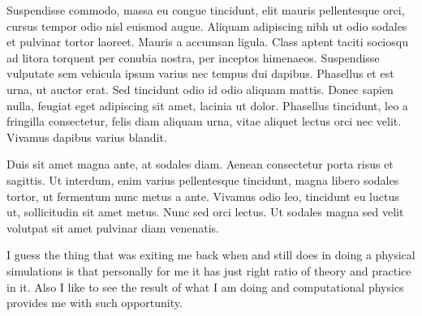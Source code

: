 \documentclass[11pt, a4paper]{awesome-cv}
\begin{document}
\begin{cvletter}
Suspendisse commodo, massa eu congue tincidunt, elit mauris pellentesque orci, cursus tempor odio nisl euismod augue. Aliquam adipiscing nibh ut odio sodales et pulvinar tortor laoreet. Mauris a accumsan ligula. Class aptent taciti sociosqu ad litora torquent per conubia nostra, per inceptos himenaeos. Suspendisse vulputate sem vehicula ipsum varius nec tempus dui dapibus. Phasellus et est urna, ut auctor erat. Sed tincidunt odio id odio aliquam mattis. Donec sapien nulla, feugiat eget adipiscing sit amet, lacinia ut dolor. Phasellus tincidunt, leo a fringilla consectetur, felis diam aliquam urna, vitae aliquet lectus orci nec velit. Vivamus dapibus varius blandit.

Duis sit amet magna ante, at sodales diam. Aenean consectetur porta risus et sagittis. Ut interdum, enim varius pellentesque tincidunt, magna libero sodales tortor, ut fermentum nunc metus a ante. Vivamus odio leo, tincidunt eu luctus ut, sollicitudin sit amet metus. Nunc sed orci lectus. Ut sodales magna sed velit volutpat sit amet pulvinar diam venenatis.

\end{cvletter}



I guess the thing that was exiting me back when and still does in doing a physical simulations is that personally for me it has just right ratio of theory and practice in it. Also I like to see the result of what I am doing and computational physics provides me with such opportunity.

\makeletterclosing
\end{document}
